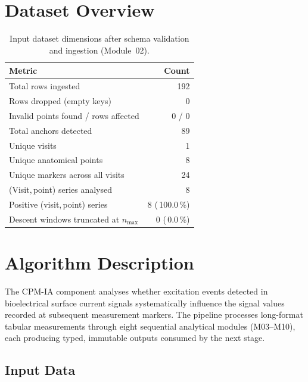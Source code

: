 \documentclass[a4paper,11pt]{article}
\begin{document}
\section{Dataset Overview}

\begin{table}[h!]
\centering
\small
\caption{Input dataset dimensions after schema validation and ingestion (Module~02).}
\begin{tabular}{lr}
\toprule
\textbf{Metric} & \textbf{Count} \\
\midrule
Total rows ingested                        & 192 \\
Rows dropped (empty keys)                  & 0 \\
Invalid points found / rows affected       & 0 / 0 \\
Total anchors detected                     & 89 \\
Unique visits                          & 1 \\
Unique anatomical points               & 8 \\
Unique markers across all visits       & 24 \\
(Visit,\,point) series analysed        & 8 \\
Positive (visit,\,point) series        & 8 (\,100.0\,\%) \\
Descent windows truncated at $n_{\max}$ & 0 (\,0.0\,\%) \\
\bottomrule
\end{tabular}
\end{table}

\section{Algorithm Description}

The CPM-IA component analyses whether excitation events detected in bioelectrical surface
current signals systematically influence the signal values recorded at subsequent measurement
markers. The pipeline processes long-format tabular measurements through eight sequential
analytical modules (M03--M10), each producing typed, immutable outputs consumed by the next
stage.

\subsection{Input Data}
\end{document}
